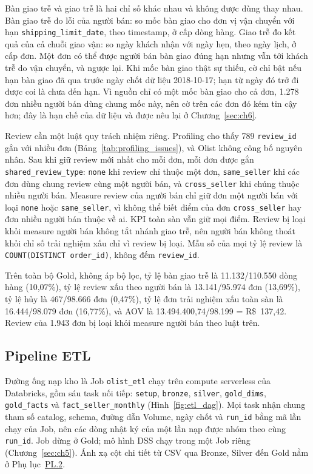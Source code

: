 \documentclass[a4paper]{article}
\begin{document}
Bàn giao trễ và giao trễ là hai chỉ số khác nhau và không được dùng thay nhau. Bàn giao trễ đo lỗi của người bán: so mốc bàn giao cho đơn vị vận chuyển với hạn \texttt{shipping\_limit\_date}, theo timestamp, ở cấp dòng hàng. Giao trễ đo kết quả của cả chuỗi giao vận: so ngày khách nhận với ngày hẹn, theo ngày lịch, ở cấp đơn. Một đơn có thể được người bán bàn giao đúng hạn nhưng vẫn tới khách trễ do vận chuyển, và ngược lại. Khi mốc bàn giao thật sự thiếu, cờ chỉ bật nếu hạn bàn giao đã qua trước ngày chốt dữ liệu 2018-10-17; hạn từ ngày đó trở đi được coi là chưa đến hạn. Vì nguồn chỉ có một mốc bàn giao cho cả đơn, 1.278 đơn nhiều người bán dùng chung mốc này, nên cờ trên các đơn đó kém tin cậy hơn; đây là hạn chế của dữ liệu và được nêu lại ở Chương~\ref{sec:ch6}.

Review cần một luật quy trách nhiệm riêng. Profiling cho thấy 789 \texttt{review\_id} gắn với nhiều đơn (Bảng~\ref{tab:profiling_issues}), và Olist không công bố nguyên nhân. Sau khi giữ review mới nhất cho mỗi đơn, mỗi đơn được gắn \texttt{shared\_review\_type}: \texttt{none} khi review chỉ thuộc một đơn, \texttt{same\_seller} khi các đơn dùng chung review cùng một người bán, và \texttt{cross\_seller} khi chúng thuộc nhiều người bán. Measure review của người bán chỉ giữ đơn một người bán với loại \texttt{none} hoặc \texttt{same\_seller}, vì không thể biết điểm của đơn \texttt{cross\_seller} hay đơn nhiều người bán thuộc về ai. KPI toàn sàn vẫn giữ mọi điểm. Review bị loại khỏi measure người bán không tắt nhánh giao trễ, nên người bán không thoát khỏi chỉ số trải nghiệm xấu chỉ vì review bị loại. Mẫu số của mọi tỷ lệ review là \texttt{COUNT(DISTINCT order\_id)}, không đếm \texttt{review\_id}.

Trên toàn bộ Gold, không áp bộ lọc, tỷ lệ bàn giao trễ là 11.132/110.550 dòng hàng (10,07\%), tỷ lệ review xấu theo người bán là 13.141/95.974 đơn (13,69\%), tỷ lệ hủy là 467/98.666 đơn (0,47\%), tỷ lệ đơn trải nghiệm xấu toàn sàn là 16.444/98.079 đơn (16,77\%), và AOV là 13.494.400,74/98.199 = R\$~137,42. Review của 1.943 đơn bị loại khỏi measure người bán theo luật trên.

\subsection{Pipeline ETL}
\label{subsec:4_4}

Đường ống nạp kho là Job \texttt{olist\_etl} chạy trên compute serverless của Databricks, gồm sáu task nối tiếp: \texttt{setup}, \texttt{bronze}, \texttt{silver}, \texttt{gold\_dims}, \texttt{gold\_facts} và \texttt{fact\_seller\_monthly} (Hình~\ref{fig:etl_dag}). Mọi task nhận chung tham số catalog, schema, đường dẫn Volume, ngày chốt và \texttt{run\_id} bằng mã lần chạy của Job, nên các dòng nhật ký của một lần nạp được nhóm theo cùng \texttt{run\_id}. Job dừng ở Gold; mô hình DSS chạy trong một Job riêng (Chương~\ref{sec:ch5}). Ánh xạ cột chi tiết từ CSV qua Bronze, Silver đến Gold nằm ở Phụ lục~\hyperref[pl:2]{PL.2}.
\end{document}

